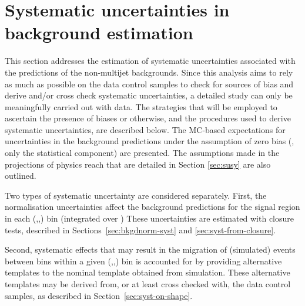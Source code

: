\section{Systematic uncertainties in background estimation}
\label{sec:systematics}

This section addresses the estimation of systematic uncertainties
associated with the predictions of the non-multijet backgrounds. Since
this analysis aims to rely as much as possible on the data control
samples to check for sources of bias and derive and/or cross check
systematic uncertainties, a detailed study can only be meaningfully
carried out with data. The strategies that will be employed to
ascertain the presence of biases or otherwise, and the procedures used
to derive systematic uncertainties, are described below. The MC-based
expectations for uncertainties in the background predictions under the
assumption of zero bias (\ie, only the statistical component) are
presented. The assumptions made in the projections of physics reach
that are detailed in Section \ref{sec:susy} are also outlined.

Two types of systematic uncertainty are considered separately. First,
the normalisation uncertainties affect the background predictions for
the signal region in each (\nb,\njet,\scalht) bin (integrated over \mht)
These uncertainties are estimated with closure tests, described in
Sections~\ref{sec:bkgdnorm-syst} and \ref{sec:syst-from-closure}.

Second, systematic effects that may result in the migration of
(simulated) events between \mht bins within a given (\njet,\nb,\scalht)
bin is accounted for by providing alternative templates to the nominal
\mht template obtained from simulation. These alternative \mht
templates may be derived from, or at least cross checked with, the
data control samples, as described in Section~\ref{sec:syst-on-shape}.

%

